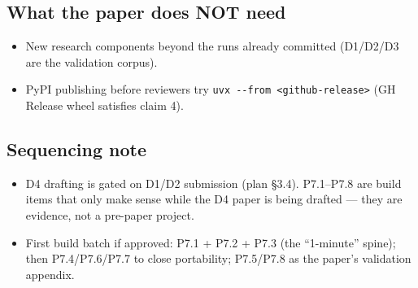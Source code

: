 \documentclass[11pt]{article}
\providecommand{\tightlist}{%
  \setlength{\itemsep}{0pt}\setlength{\parskip}{0pt}}
\begin{document}
\subsection{What the paper does NOT
need}\label{what-the-paper-does-not-need}

\begin{itemize}
\tightlist
\item
  New research components beyond the runs already committed (D1/D2/D3
  are the validation corpus).
\item
  PyPI publishing before reviewers try
  \texttt{uvx\ -\/-from\ \textless{}github-release\textgreater{}} (GH
  Release wheel satisfies claim 4).
\end{itemize}

\subsection{Sequencing note}\label{sequencing-note}

\begin{itemize}
\tightlist
\item
  D4 drafting is gated on D1/D2 submission (plan §3.4). P7.1--P7.8 are
  build items that only make sense while the D4 paper is being drafted
  --- they are evidence, not a pre-paper project.
\item
  First build batch if approved: P7.1 + P7.2 + P7.3 (the ``1-minute''
  spine); then P7.4/P7.6/P7.7 to close portability; P7.5/P7.8 as the
  paper's validation appendix.
\end{itemize}
\end{document}
